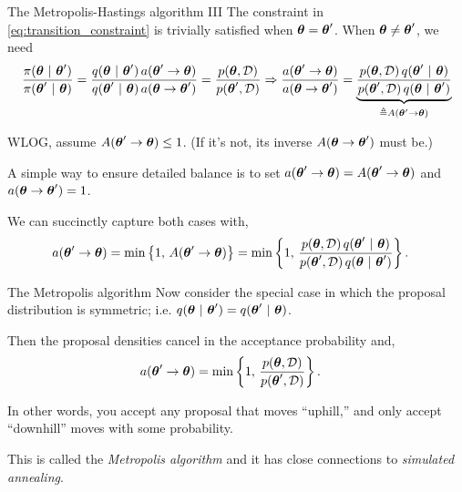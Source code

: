 \documentclass[aspectratio=169]{beamer}
\begin{document}
\begin{frame}{The Metropolis-Hastings algorithm III}
The constraint in \eqref{eq:transition_constraint} is trivially satisfied when $\boldsymbol{\theta} = \boldsymbol{\theta}'$. When $\boldsymbol{\theta} \neq \boldsymbol{\theta}'$, we need
\begin{multline}
    \frac{\pi(\boldsymbol{\theta} ~\vert~ \boldsymbol{\theta}')}{\pi(\boldsymbol{\theta}' ~\vert~ \boldsymbol{\theta})}
    = 
    \frac{q(\boldsymbol{\theta} ~\vert~ \boldsymbol{\theta}') \, a(\boldsymbol{\theta}' \to \boldsymbol{\theta})}{q(\boldsymbol{\theta}' ~\vert~ \boldsymbol{\theta}) \, a(\boldsymbol{\theta} \to \boldsymbol{\theta}')}
    = 
    \frac{p(\boldsymbol{\theta}, \mathcal{D})}{p(\boldsymbol{\theta}',  \mathcal{D})}
    \Rightarrow
    \frac{a(\boldsymbol{\theta}' \to \boldsymbol{\theta})}{a(\boldsymbol{\theta} \to \boldsymbol{\theta}')}
    = 
    \underbrace{\frac{p(\boldsymbol{\theta}, \mathcal{D}) \, q(\boldsymbol{\theta}' ~\vert~ \boldsymbol{\theta})}{p(\boldsymbol{\theta}',  \mathcal{D}) \, q(\boldsymbol{\theta} ~\vert~ \boldsymbol{\theta}') }}_{\triangleq A(\boldsymbol{\theta}' \to \boldsymbol{\theta})}
\end{multline}

WLOG, assume $ A(\boldsymbol{\theta}' \to \boldsymbol{\theta}) \leq 1$. (If it's not, its inverse $A(\boldsymbol{\theta} \to \boldsymbol{\theta}')$ must be.) 

A simple way to ensure detailed balance is to set $a(\boldsymbol{\theta}' \to \boldsymbol{\theta}) = A(\boldsymbol{\theta}' \to \boldsymbol{\theta})$ and $a(\boldsymbol{\theta} \to \boldsymbol{\theta}') = 1$. 

We can succinctly capture both cases with,
\begin{align}
    a(\boldsymbol{\theta}' \to \boldsymbol{\theta}) &= 
    \min \left\{1, \, A(\boldsymbol{\theta}' \to \boldsymbol{\theta}) \right \} = 
    \min \left\{1, \, \frac{p(\boldsymbol{\theta}, \mathcal{D}) \, q(\boldsymbol{\theta}' ~\vert~ \boldsymbol{\theta})}{p(\boldsymbol{\theta}',  \mathcal{D}) \, q(\boldsymbol{\theta} ~\vert~ \boldsymbol{\theta}')} \right \}.
\end{align}

\end{frame} 

\begin{frame}{The Metropolis algorithm}
    Now consider the special case in which the proposal distribution is symmetric; i.e. $q(\boldsymbol{\theta} ~\vert~ \boldsymbol{\theta}') = q(\boldsymbol{\theta}' ~\vert~ \boldsymbol{\theta})$.
    
    Then the proposal densities cancel in the acceptance probability and,
    \begin{align}
    a(\boldsymbol{\theta}' \to \boldsymbol{\theta}) &= 
        \min \left\{1, \, \frac{p(\boldsymbol{\theta}, \mathcal{D})}{p(\boldsymbol{\theta}',  \mathcal{D})} \right \}.
    \end{align}

    In other words, you accept any proposal that moves ``uphill,'' and only accept ``downhill'' moves with some probability. 
    
    This is called the \textit{Metropolis algorithm} and it has close connections to \textit{simulated annealing}.
\end{frame}
\end{document}
